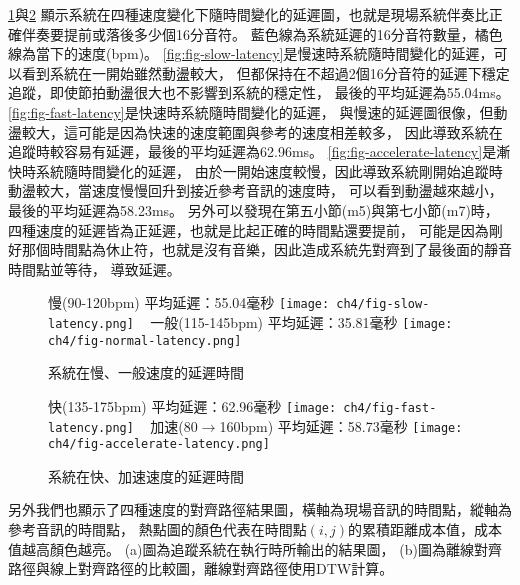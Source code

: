 \documentclass[class=NCU_thesis, crop=false]{standalone}
\begin{document}
\cref{fig:fig-ch4-slow-and-normal-latency-results}與\cref{fig:fig-ch4-fast-and-accelerate-latency-results}
顯示系統在四種速度變化下隨時間變化的延遲圖，也就是現場系統伴奏比正確伴奏要提前或落後多少個16分音符。
藍色線為系統延遲的16分音符數量，橘色線為當下的速度(bpm)。
\cref{fig:fig-slow-latency}是慢速時系統隨時間變化的延遲，可以看到系統在一開始雖然動盪較大，
但都保持在不超過2個16分音符的延遲下穩定追蹤，即使節拍動盪很大也不影響到系統的穩定性，
最後的平均延遲為55.04ms。
\cref{fig:fig-fast-latency}是快速時系統隨時間變化的延遲，
與慢速的延遲圖很像，但動盪較大，這可能是因為快速的速度範圍與參考的速度相差較多，
因此導致系統在追蹤時較容易有延遲，最後的平均延遲為62.96ms。
\cref{fig:fig-accelerate-latency}是漸快時系統隨時間變化的延遲，
由於一開始速度較慢，因此導致系統剛開始追蹤時動盪較大，當速度慢慢回升到接近參考音訊的速度時，
可以看到動盪越來越小，最後的平均延遲為58.23ms。
另外可以發現在第五小節(m5)與第七小節(m7)時，四種速度的延遲皆為正延遲，也就是比起正確的時間點還要提前，
可能是因為剛好那個時間點為休止符，也就是沒有音樂，因此造成系統先對齊到了最後面的靜音時間點並等待，
導致延遲。

\begin{figure}[H]
    \centering
    \subcaptionbox
    {慢(90-120bpm) 平均延遲：55.04毫秒
    \label{fig:fig-slow-latency}}
    {\texttt{[image: ch4/fig-slow-latency.png]}}
    ~
    \subcaptionbox
    {一般(115-145bpm) 平均延遲：35.81毫秒
    \label{fig:fig-normal-latency}}
    {\texttt{[image: ch4/fig-normal-latency.png]}}
    \caption{系統在慢、一般速度的延遲時間}
    \label{fig:fig-ch4-slow-and-normal-latency-results}
\end{figure}

\begin{figure}[H]
    \centering
    \subcaptionbox
    {快(135-175bpm) 平均延遲：62.96毫秒
    \label{fig:fig-fast-latency}}
    {\texttt{[image: ch4/fig-fast-latency.png]}}
    ~
    \subcaptionbox
    {加速(80$ \rightarrow $160bpm) 平均延遲：58.73毫秒
    \label{fig:fig-accelerate-latency}}
    {\texttt{[image: ch4/fig-accelerate-latency.png]}}
    \caption{系統在快、加速速度的延遲時間}
    \label{fig:fig-ch4-fast-and-accelerate-latency-results}
\end{figure}


另外我們也顯示了四種速度的對齊路徑結果圖，橫軸為現場音訊的時間點，縱軸為參考音訊的時間點，
熱點圖的顏色代表在時間點$(i, j)$的累積距離成本值，成本值越高顏色越亮。
(a)圖為追蹤系統在執行時所輸出的結果圖，
(b)圖為離線對齊路徑與線上對齊路徑的比較圖，離線對齊路徑使用DTW計算。
\end{document}
